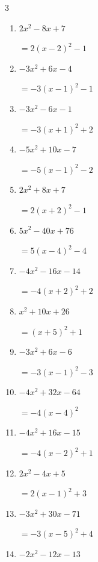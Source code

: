 \begin{multicols}{3}
\begin{enumerate}
        $=-4\left( x+1\right)^{2}+1$

  \item $2x^{2}-8x+7$

        $=2\left( x-2\right)^{2}-1$

  \item $-3x^{2}+6x-4$

        $=-3\left( x-1\right)^{2}-1$

  \item $-3x^{2}-6x-1$

        $=-3\left( x+1\right)^{2}+2$

  \item $-5x^{2}+10x-7$

        $=-5\left( x-1\right)^{2}-2$

  \item $2x^{2}+8x+7$

        $=2\left( x+2\right)^{2}-1$

  \item $5x^{2}-40x+76$

        $=5\left( x-4\right)^{2}-4$

\columnbreak %

\resetques

  \item $-4x^{2}-16x-14$

        $=-4\left( x+2\right)^{2}+2$

  \item $x^{2}+10x+26$

        $=\left( x+5\right)^{2}+1$

  \item $-3x^{2}+6x-6$

        $=-3\left( x-1\right)^{2}-3$

  \item $-4x^{2}+32x-64$

        $=-4\left( x-4\right)^{2}$

  \item $-4x^{2}+16x-15$

        $=-4\left( x-2\right)^{2}+1$

  \item $2x^{2}-4x+5$

        $=2\left( x-1\right)^{2}+3$

  \item $-3x^{2}+30x-71$

        $=-3\left( x-5\right)^{2}+4$

  \item $-2x^{2}-12x-13$


\end{enumerate}
\end{multicols}
